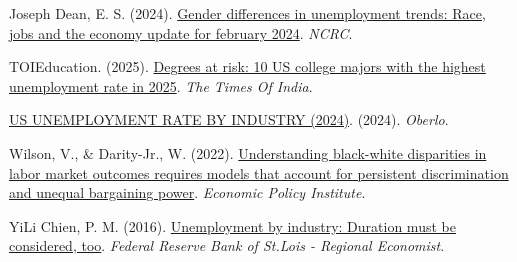 \documentclass[
]{agujournal2019}
\newlength{\cslhangindent}
\newenvironment{CSLReferences}[2] %
 {\begin{list}{}{%
  \setlength{\itemindent}{0pt}
  \setlength{\leftmargin}{0pt}
  \setlength{\parsep}{0pt}
  \ifodd #1
   \setlength{\leftmargin}{\cslhangindent}
   \setlength{\itemindent}{-1\cslhangindent}
  \fi
  \setlength{\itemsep}{#2\baselineskip}}}
 {\end{list}}
\begin{document}
\label{refs}
\begin{CSLReferences}{1}{0}
Joseph Dean, E. S. (2024). \href{}{Gender differences in unemployment
trends: Race, jobs and the economy update for february 2024}.
\emph{NCRC}.

TOIEducation. (2025). \href{}{Degrees at risk: 10 US college majors with
the highest unemployment rate in 2025}. \emph{The Times Of India}.

\href{}{US UNEMPLOYMENT RATE BY INDUSTRY (2024)}. (2024). \emph{Oberlo}.

Wilson, V., \& Darity-Jr., W. (2022). \href{}{Understanding black-white
disparities in labor market outcomes requires models that account for
persistent discrimination and unequal bargaining power}. \emph{Economic
Policy Institute}.

YiLi Chien, P. M. (2016). \href{}{Unemployment by industry: Duration
must be considered, too}. \emph{Federal Reserve Bank of St.Lois -
Regional Economist}.

\end{CSLReferences}
\end{document}
